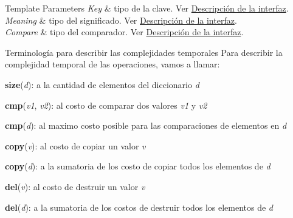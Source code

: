 \begin{DoxyTemplParams}{Template Parameters}
{\em Key} & tipo de la clave. Ver \hyperlink{Interfaz}{Descripción de la interfaz}. \\
\hline
{\em Meaning} & tipo del significado. Ver \hyperlink{Interfaz}{Descripción de la interfaz}. \\
\hline
{\em Compare} & tipo del comparador. Ver \hyperlink{Interfaz}{Descripción de la interfaz}.\\
\hline
\end{DoxyTemplParams}
\begin{DoxyParagraph}{Terminología para describir las complejidades temporales}
Para describir la complejidad temporal de las operaciones, vamos a llamar\+:
\begin{DoxyItemize}
\item {\bfseries size}({\itshape d})\+: a la cantidad de elementos del diccionario {\itshape d} 
\item {\bfseries cmp}({\itshape v1}, {\itshape v2})\+: al costo de comparar dos valores {\itshape v1} y {\itshape v2} 
\item {\bfseries cmp}({\itshape d})\+: al maximo costo posible para las comparaciones de elementos en {\itshape d} 
\item {\bfseries copy}({\itshape v})\+: al costo de copiar un valor {\itshape v} 
\item {\bfseries copy}({\itshape d})\+: a la sumatoria de los costo de copiar todos los elementos de {\itshape d} 
\item {\bfseries del}({\itshape v})\+: al costo de destruir un valor {\itshape v} 
\item {\bfseries del}({\itshape d})\+: a la sumatoria de los costos de destruir todos los elementos de {\itshape d} 
\end{DoxyItemize}
\end{DoxyParagraph}


